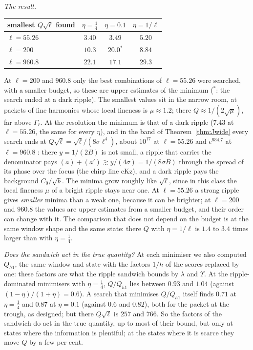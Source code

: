 \emph{The result.}
\begin{center}
\small
\begin{tabular}{lccc}
smallest $Q\sqrt\ell$ found & $\eta=\tfrac14$ & $\eta=0.1$ & $\eta=1/\ell$\\ \hline
$\ell=55.26$ & $3.40$ & $3.49$ & $5.20$\\
$\ell=200$ & $10.3$ & $20.0^*$ & $8.84$\\
$\ell=960.8$ & $22.1$ & $17.1$ & $29.3$\\
\end{tabular}
\end{center}
At $\ell=200$ and $960.8$ only the best combinations of $\ell=55.26$ were searched, with a smaller budget, so these are upper estimates of the minimum (${}^*$: the search ended at a dark ripple).
The smallest values sit in the narrow room, at packets of fine harmonics whose local fineness is $\mu\approx1.2$; there $Q\approx1/(2\sqrt\mu)$, far above $\Gamma_\ell$.
At the resolution the minimum is that of a dark ripple ($7.43$ at $\ell=55.26$, the same for every $\eta$), and in the band of Theorem~\ref{thm:Jwide} every search ends at $Q\sqrt\ell=\sqrt\ell/(8\sigma\ell^4)$, about $10^{17}$ at $\ell=55.26$ and $e^{934.7}$ at $\ell=960.8$ \derivst: there $y=1/(2B)$ is not small, a ripple that carries the denominator pays $(a)+(a')\gtrsim y/(4\sigma)=1/(8\sigma B)$ through the spread of its phase over the focus (the chirp line cKz), and a dark ripple pays the background $C_0/\sqrt b$.
The minima grow roughly like $\sqrt\ell$, since in this class the local fineness $\mu$ of a bright ripple stays near one.
At $\ell=55.26$ a strong ripple gives \emph{smaller} minima than a weak one, because it can be brighter; at $\ell=200$ and $960.8$ the values are upper estimates from a smaller budget, and their order can change with it. The comparison that does not depend on the budget is at the same window shape and the same state: there $Q$ with $\eta=1/\ell$ is $1.4$ to $3.4$ times larger than with $\eta=\tfrac14$.

\emph{Does the sandwich act in the true quantity?}
At each minimiser we also computed $Q_{h1}$, the same window and state with the factors $1/h$ of the scores replaced by one: these factors are what the ripple sandwich bounds by $\lambda$ and $\Upsilon$.
At the ripple-dominated minimisers with $\eta=\tfrac14$, $Q/Q_{h1}$ lies between $0.93$ and $1.04$ (against $(1-\eta)/(1+\eta)=0.6$).
A search that minimises $Q/Q_{h1}$ itself finds $0.71$ at $\eta=\tfrac14$ and $0.87$ at $\eta=0.1$ (against $0.6$ and $0.82$), both for the packet at the trough, as designed; but there $Q\sqrt\ell$ is $257$ and $766$.
So the factors of the sandwich do act in the true quantity, up to most of their bound, but only at states where the information is plentiful; at the states where it is scarce they move $Q$ by a few per cent.

